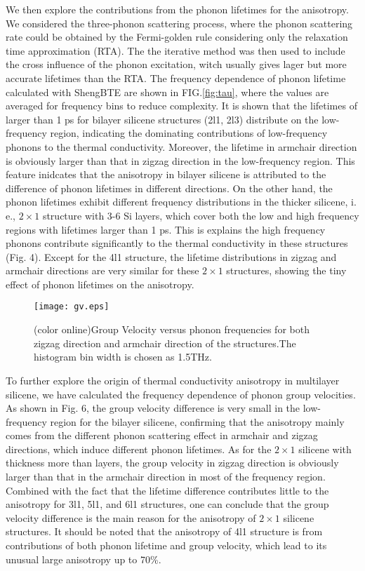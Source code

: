 \documentclass[aps,prb,twocolumn,showpacs,amsmath,amssymb]{revtex4-1}
\begin{document}
We then explore the contributions from the phonon lifetimes for the anisotropy.
We considered the three-phonon scattering process, where the phonon scattering rate could be obtained by the Fermi-golden rule\cite{Li2014} considering only the relaxation time approximation (RTA). The the iterative method was then used to include the cross influence of the phonon excitation, witch usually gives lager but more accurate lifetimes than the RTA. The frequency dependence of phonon lifetime calculated with ShengBTE\cite{Li2014} are shown in FIG.\ref{fig:tau}, where the values are averaged for frequency bins to reduce complexity.  It is shown that the lifetimes of larger than 1 ps for bilayer silicene structures (2l1, 2l3) distribute on the low-frequency region, indicating the dominating contributions of low-frequency phonons to the thermal conductivity. Moreover, the lifetime in armchair direction is obviously larger than that in zigzag direction in the low-frequency region. This feature inidcates that the anisotropy in bilayer silicene is attributed to the difference of phonon lifetimes in different directions.
On the other hand, the phonon lifetimes exhibit different frequency distributions in the thicker silicene, i. e.,  $2\times1$ structure with 3-6 Si layers, which cover both the low and high frequency regions with lifetimes  larger than 1 ps.  This is explains the high frequency phonons contribute significantly to the thermal conductivity in these structures (Fig. 4).  Except for the 4l1 structure, the lifetime distributions in zigzag and armchair directions are very similar for these  $2\times1$ structures, showing the tiny effect of phonon lifetimes on the anisotropy.


\begin{figure}[b]
  \texttt{[image: gv.eps]}{}
  \caption{\label{fig:gv} (color online)Group Velocity versus phonon frequencies for both zigzag direction and armchair direction of the structures.The histogram bin width is chosen as 1.5THz.}
\end{figure}

To further explore the origin of thermal conductivity anisotropy in multilayer  silicene, we have calculated the frequency dependence of phonon group velocities. As shown in Fig. 6,  the group velocity  difference is very small in the low-frequency region for the bilayer silicene, confirming that the anisotropy mainly comes from the different phonon scattering effect in armchair and zigzag directions,  which induce different phonon lifetimes.
As for the $2\times 1$ silicene with thickness more than layers,  the group velocity in zigzag direction is obviously larger than that in the armchair direction in most of the frequency region. Combined with the fact that the lifetime difference contributes little to the anisotropy for 3l1, 5l1, and 6l1 structures, one can conclude that the group velocity difference is the main reason for the anisotropy of $2\times 1$ silicene structures. It should be noted that the anisotropy of 4l1 structure is from contributions of both phonon lifetime and group velocity, which lead to its unusual large anisotropy up to 70\%.
\end{document}
